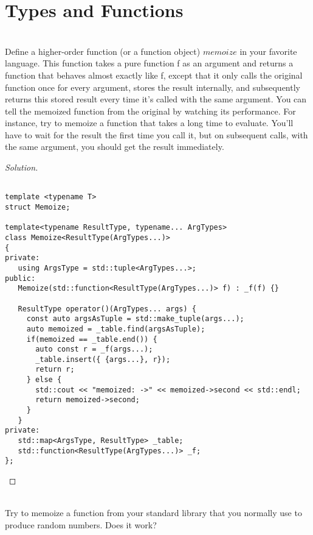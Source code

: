 \documentclass[7x10,thmnumcontwithchapter,WebLink,AddlevelTwoTOC,NumRef,BookEndNote,printer]{pupbook}
\begin{document}
\chapter[Types and Functions]{Types and Functions\thefootnote}

\begin{exercise}
~\\
Define a higher-order function (or a function object) $memoize$ in
your favorite language. This function takes a pure function f as
an argument and returns a function that behaves almost exactly
like f, except that it only calls the original function once for every
argument, stores the result internally, and subsequently returns
this stored result every time it’s called with the same argument.
You can tell the memoized function from the original by watching
its performance. For instance, try to memoize a function that
takes a long time to evaluate. You’ll have to wait for the result
the first time you call it, but on subsequent calls, with the same
argument, you should get the result immediately.
\end{exercise}

\begin{proof}[Solution]
~\\
\begin{lstlisting}

template <typename T>
struct Memoize;

template<typename ResultType, typename... ArgTypes>
class Memoize<ResultType(ArgTypes...)>
{
private:
   using ArgsType = std::tuple<ArgTypes...>;
public:
   Memoize(std::function<ResultType(ArgTypes...)> f) : _f(f) {}

   ResultType operator()(ArgTypes... args) {
     const auto argsAsTuple = std::make_tuple(args...);
     auto memoized = _table.find(argsAsTuple);
     if(memoized == _table.end()) {
       auto const r = _f(args...);
       _table.insert({ {args...}, r});
       return r;
     } else {
       std::cout << "memoized: ->" << memoized->second << std::endl;
       return memoized->second;
     }
   }
private:
   std::map<ArgsType, ResultType> _table;
   std::function<ResultType(ArgTypes...)> _f;
};	
\end{lstlisting}
\end{proof}


\begin{exercise}
~\\
	Try to memoize a function from your standard library that you
	normally use to produce random numbers. Does it work?
\end{exercise}
\end{document}
